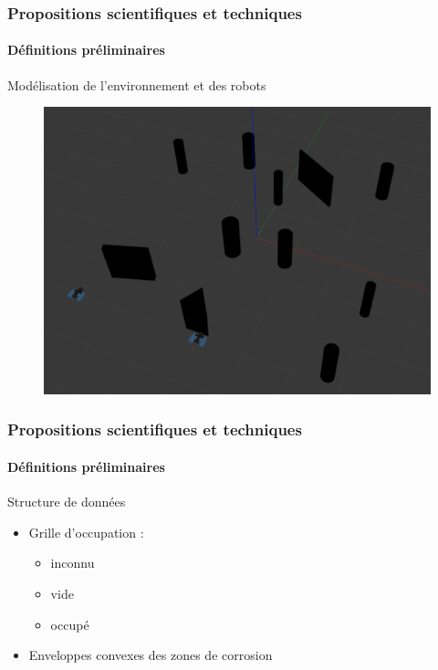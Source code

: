 \documentclass{beamer}
\begin{document}
			\begin{frame}
				\frametitle{Propositions scientifiques et techniques}
				\framesubtitle{Définitions préliminaires}
				Modélisation de l'environnement et des robots
				\begin{figure}[H]
					\centering
					\includegraphics[width=0.7\linewidth]{graphics/exemple_model.png}
				\end{figure}
			\end{frame}
			\begin{frame}
				\frametitle{Propositions scientifiques et techniques}
				\framesubtitle{Définitions préliminaires}
				\begin{block}{Structure de données}
					\begin{itemize}
						\item Grille d'occupation :
						\begin{itemize}
							\item inconnu
							\item vide
							\item occupé
						\end{itemize}
					\end{itemize}
				\end{block}
				\begin{itemize}
					\item Enveloppes convexes des zones de corrosion
				\end{itemize}
			\end{frame}
\end{document}
